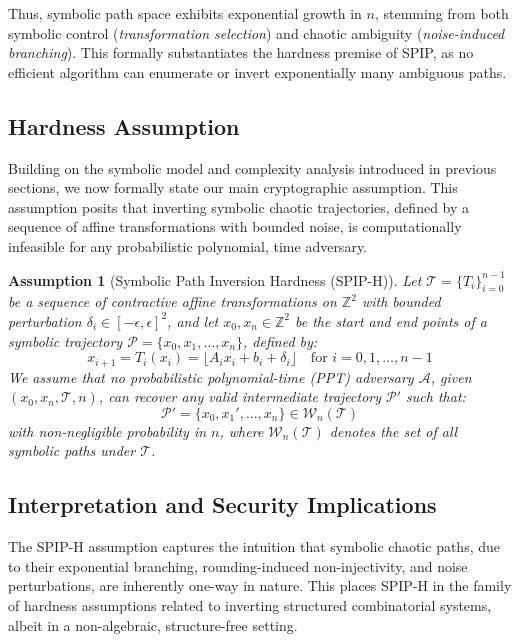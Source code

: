 \documentclass[twocolumn,10pt]{article}
\newtheorem{assumption}{Assumption}
\begin{document}
Thus, symbolic path space exhibits exponential growth in $n$, stemming from both symbolic control (\textit{transformation selection}) and chaotic ambiguity (\textit{noise-induced branching}). This formally substantiates the hardness premise of SPIP, as no efficient algorithm can enumerate or invert exponentially many ambiguous paths.


\subsection{Hardness Assumption} \label{sec:spip-assumption}
\vspace{0.8em}

Building on the symbolic model and complexity analysis introduced in previous sections, we now formally state our main cryptographic assumption. This assumption posits that inverting symbolic chaotic trajectories, defined by a sequence of affine transformations with bounded noise, is computationally infeasible for any probabilistic polynomial, time adversary.

\begin{assumption}[Symbolic Path Inversion Hardness (SPIP-H)]
Let $\mathcal{T} = \{T_i\}_{i=0}^{n-1}$ be a sequence of contractive affine transformations on $\mathbb{Z}^2$ with bounded perturbation $\delta_i \in [-\epsilon, \epsilon]^2$, and let $x_0, x_n \in \mathbb{Z}^2$ be the start and end points of a symbolic trajectory $\mathcal{P} = \{x_0, x_1, \dots, x_n\}$, defined by:
\[
x_{i+1} = T_i(x_i) = \lfloor A_i x_i + b_i + \delta_i \rfloor
\quad \text{for } i = 0, 1, \dots, n-1
\]
We assume that no probabilistic polynomial-time (PPT) adversary $\mathcal{A}$, given $(x_0, x_n, \mathcal{T}, n)$, can recover any valid intermediate trajectory $\mathcal{P}'$ such that:
\[
\mathcal{P}' = \{x_0, x_1', ..., x_n\} \in \mathcal{W}_n(\mathcal{T})
\]
with non-negligible probability in $n$, where $\mathcal{W}_n(\mathcal{T})$ denotes the set of all symbolic paths under $\mathcal{T}$.
\end{assumption}

\subsection{Interpretation and Security Implications}

The SPIP-H assumption captures the intuition that symbolic chaotic paths, due to their exponential branching, rounding-induced non-injectivity, and noise perturbations, are inherently one-way in nature. This places SPIP-H in the family of hardness assumptions related to inverting structured combinatorial systems, albeit in a non-algebraic, structure-free setting.
\end{document}
